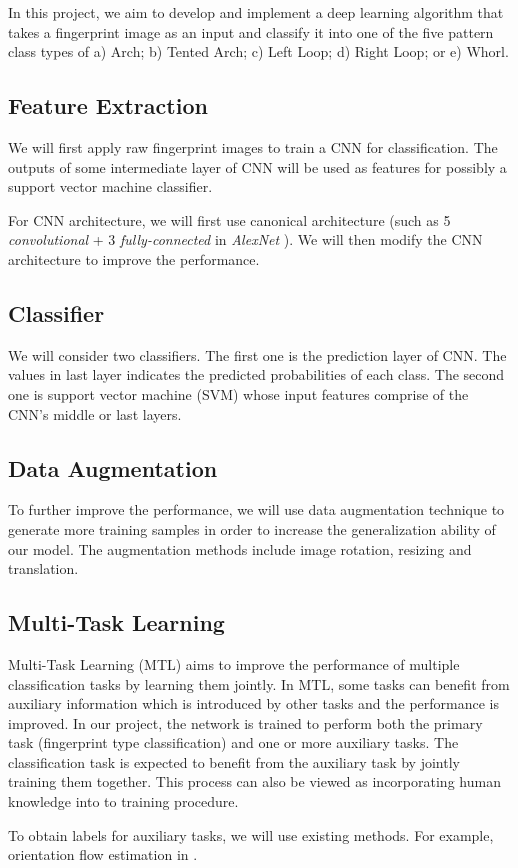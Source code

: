 
In this project, we aim to develop and implement a deep learning algorithm that takes a fingerprint image as an input and classify it into one of the five pattern class types of a) Arch; b) Tented Arch; c) Left Loop; d) Right Loop; or e) Whorl. 

\subsection{Feature Extraction}
%
We will first apply raw fingerprint images to train a CNN for classification. The outputs of some intermediate layer of CNN will be used as features for possibly a support vector machine classifier.

For CNN architecture, we will first use canonical architecture (such as 5 \textit{convolutional} + 3 \textit{fully-connected} in \textit{AlexNet} \cite{krizhevsky2012imagenet}).
%
We will then modify the CNN architecture to improve the performance.
%
\subsection{Classifier}
%
We will consider two classifiers. The first one is the prediction layer of CNN. The values in last layer indicates the predicted probabilities of each class.
%
The second one is support vector machine (SVM) whose input features comprise of the CNN’s middle or last layers.

\subsection{Data Augmentation}

%
To further improve the performance, we will use data augmentation technique to generate more training samples in order to increase the generalization ability of our model. 
%
The augmentation methods include image rotation, resizing and translation.

\subsection{Multi-Task Learning}

Multi-Task Learning (MTL)\cite{caruana1998multitask} aims to improve the performance of multiple classification tasks by learning them jointly.
%
In MTL, some tasks can benefit from auxiliary information which is introduced by other tasks and the performance is improved\cite{zhang2016learning}.
%
In our project, the network is trained to perform both the primary task (fingerprint type classification) and one or more auxiliary tasks. 
%
The classification task is expected to benefit from the auxiliary task by jointly training them together.
%
This process can also be viewed as incorporating human knowledge into to training procedure.

To obtain labels for auxiliary tasks, we will use existing methods. For example, orientation flow estimation in \cite{NFIQ}.
